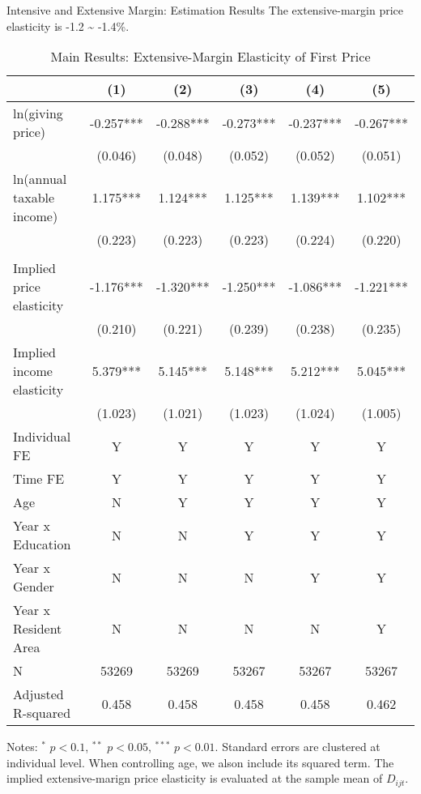 \documentclass[
  ignorenonframetext,
  aspectratio=169,
]{beamer}
\begin{document}
\begin{frame}{Intensive and Extensive Margin: Estimation Results}
\protect\hypertarget{intensive-and-extensive-margin-estimation-results-1}{}
The extensive-margin price elasticity is -1.2 \textasciitilde{} -1.4\%.

\begin{table}

\caption{\label{tab:MainExtensive}Main Results: Extensive-Margin Elasticity of First Price}
\centering
\fontsize{7}{9}\selectfont
\begin{threeparttable}
\begin{tabular}[t]{lccccc}
\toprule
 & (1) & (2) & (3) & (4) & (5)\\
\midrule
ln(giving price) & -0.257*** & -0.288*** & -0.273*** & -0.237*** & -0.267***\\
 & (0.046) & (0.048) & (0.052) & (0.052) & (0.051)\\
ln(annual taxable income) & 1.175*** & 1.124*** & 1.125*** & 1.139*** & 1.102***\\
 & (0.223) & (0.223) & (0.223) & (0.224) & (0.220)\\
 &  &  &  &  & \\
Implied price elasticity & -1.176*** & -1.320*** & -1.250*** & -1.086*** & -1.221***\\
 & (0.210) & (0.221) & (0.239) & (0.238) & (0.235)\\
Implied income elasticity & 5.379*** & 5.145*** & 5.148*** & 5.212*** & 5.045***\\
 & (1.023) & (1.021) & (1.023) & (1.024) & (1.005)\\
Individual FE & Y & Y & Y & Y & Y\\
Time FE & Y & Y & Y & Y & Y\\
Age & N & Y & Y & Y & Y\\
Year x Education & N & N & Y & Y & Y\\
Year x Gender & N & N & N & Y & Y\\
Year x Resident Area & N & N & N & N & Y\\
N & 53269 & 53269 & 53267 & 53267 & 53267\\
Adjusted R-squared & 0.458 & 0.458 & 0.458 & 0.458 & 0.462\\
\bottomrule
\end{tabular}
\begin{tablenotes}
\item Notes: $^{*}$ $p < 0.1$, $^{**}$ $p < 0.05$, $^{***}$ $p < 0.01$. Standard errors are clustered at individual level. When controlling age, we alson include its squared term. The implied extensive-marign price elasticity is evaluated at the sample mean of $D_{ijt}$.
\end{tablenotes}
\end{threeparttable}
\end{table}
\end{frame}
\end{document}
